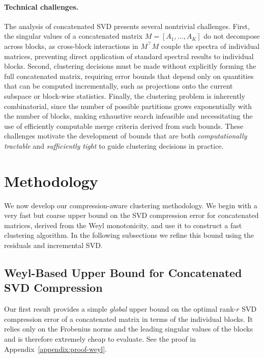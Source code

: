 \documentclass[10pt]{article} %
\begin{document}
\paragraph{Technical challenges.}
The analysis of concatenated SVD presents several nontrivial challenges.
First, the singular values of a concatenated matrix $M=[A_1,\dots,A_K]$ do not decompose across blocks, as cross-block interactions in $M^\top M$ couple the spectra of individual matrices, preventing direct application of standard spectral results to individual blocks.
Second, clustering decisions must be made without explicitly forming the full concatenated matrix, requiring error bounds that depend only on quantities that can be computed incrementally, such as projections onto the current subspace or block-wise statistics.
Finally, the clustering problem is inherently combinatorial, since the number of possible partitions grows exponentially with the number of blocks, making exhaustive search infeasible and necessitating the use of efficiently computable merge criteria derived from such bounds.
These challenges motivate the development of bounds that are both \emph{computationally tractable} and \emph{sufficiently tight} to guide clustering decisions in practice.

\section{Methodology}

We now develop our compression-aware clustering methodology. 
We begin with a very fast but coarse upper bound on the SVD compression error for
concatenated matrices, derived from the Weyl monotonicity, and use it to construct
a fast clustering algorithm. In the following subsections we refine
this bound using the residuals and incremental SVD.

\subsection{Weyl-Based Upper Bound for Concatenated SVD Compression}
\label{sec:weyl-bound}

Our first result provides a simple \emph{global} upper bound on the optimal
rank-$r$ SVD compression error of a concatenated matrix in terms of the
individual blocks. It relies only on the Frobenius norms and the leading singular
values of the blocks and is therefore extremely cheap to evaluate. See the proof in Appendix~\ref{appendix:proof-weyl}.
\end{document}
